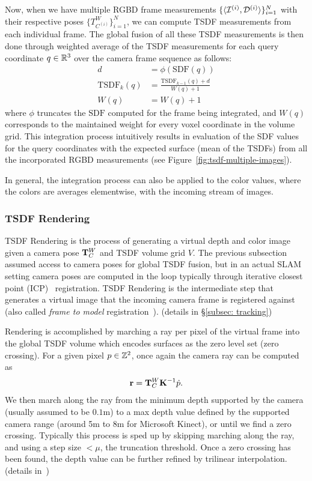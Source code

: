 Now, when we have multiple RGBD frame measurements $\{\langle \mathcal{I}^{(i)}, \mathcal{D}^{(i)} \rangle\}_{i=1}^{N}$ with their respective poses $\{ T_{C^{(i)}}^W \}_{i=1}^N$, we can compute TSDF measurements from each individual frame. The global fusion of all these TSDF measurements is then done through weighted average of the TSDF measurements for each query coordinate $q \in \mathbb{R}^3$ over the camera frame sequence as follows:
\begin{align}
    d &= \phi(\text{SDF}(q)) \\
    \text{TSDF}_k(q) &= \frac{\text{TSDF}_{k-1}(q) + d}{W(q) + 1} \\
    W(q) &= W(q) + 1
\end{align}
where $\phi$ truncates the $\text{SDF}$ computed for the frame being integrated, and $W(q)$ corresponds to the maintained weight for every voxel coordinate in the volume grid. This integration process intuitively results in evaluation of the SDF values for the query coordinates with the expected surface (mean of the TSDFs) from all the incorporated RGBD measurements (see Figure~\ref{fig:tsdf-multiple-images}).


In general, the integration process can also be applied to the color values, where the colors are averages elementwise, with the incoming stream of images.

\subsubsection{TSDF Rendering}

TSDF Rendering is the process of generating a virtual depth and color image given a camera pose $\mathbf{T}_C^W$ and TSDF volume grid $V$. The previous subsection assumed access to camera poses for global TSDF fusion, but in an actual SLAM setting camera poses are computed in the loop typically through iterative closest point (ICP)~\cite{rusinkiewiczEfficientVariantsICP2001} registration. TSDF Rendering is the intermediate step that generates a virtual image that the incoming camera frame is registered against (also called \emph{frame to model} registration~\cite{newcombeKinectFusionRealtimeDense2011}). (details in \S\ref{subsec: tracking})

Rendering is accomplished by marching a ray per pixel of the virtual frame into the global TSDF volume which encodes surfaces as the zero level set (zero crossing). For a given pixel $p \in \mathbb{Z}^2$, once again the camera ray can be computed as
\begin{align*}
    \mathbf{r} = \mathbf{T}_C^W \mathbf{K}^{-1} \dot{p}.
\end{align*}
\noindent We then march along the ray from the minimum depth supported by the camera (usually assumed to be $0.1$m) to a max depth value defined by the supported camera range (around 5m to 8m for Microsoft Kinect), or until we find a zero crossing. Typically this process is sped up by skipping marching along the ray, and using a step size $< \mu$, the truncation threshold. Once a zero crossing has been found, the depth value can be further refined by trilinear interpolation. (details in~\cite{newcombeKinectFusionRealtimeDense2011})

